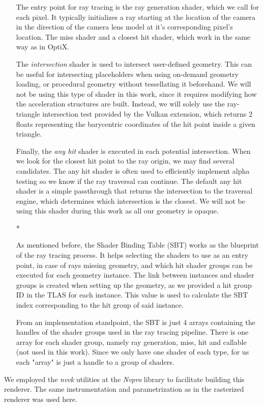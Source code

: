 \begin{itemize}
{    The entry point for ray tracing is the ray generation shader, which we call for each pixel. It typically initializes a ray starting at the location of the camera in the direction of the camera lens model at it's corresponding pixel's location. The miss shader and a closest hit shader, which work in the same way as in OptiX.

    The \textit{intersection} shader is used to intersect user-defined geometry. This can be useful for intersecting placeholders when using on-demand geometry loading, or procedural geometry without tessellating it beforehand. We will not be using this type of shader in this work, since it requires modifying how the acceleration structures are built. Instead, we will solely use the ray-triangle intersection test provided by the Vulkan extension, which returns 2 floats representing the barycentric coordinates of the hit point inside a given triangle.

    Finally, the \textit{any hit} shader is executed in each potential intersection. When we look for the closest hit point to the ray origin, we may find several candidates. The any hit shader is often used to efficiently implement alpha testing so we know if the ray traversal can continue. The default any hit shader is a simple passthrough that returns the intersection to the traversal engine, which determines which intersection is the closest. We will not be using this shader during this work as all our geometry is opaque.}
  \item[*]{As mentioned before, the Shader Binding Table (SBT) works as the blueprint of the ray tracing process. It helps selecting the shaders to use as an entry point, in case of rays missing geometry, and which hit shader groups can be executed for each geometry instance. The link between instances and shader groups is created when setting up the geometry, as we provided a hit group ID in the TLAS for each instance. This value is used to calculate the SBT index corresponding to the hit group of said instance.

    From an implementation standpoint, the SBT is just 4 arrays containing the handles of the shader groups used in the ray tracing pipeline. There is one array for each shader group, namely ray generation, miss, hit and callable (not used in this work). Since we only have one shader of each type, for us each "array" is just a handle to a group of shaders.}
\end{itemize}

We employed the \textit{nvvk} utilities at the \textit{Nvpro} library \cite{Nvpro} to facilitate building this renderer. The same instrumentation and parametrization as in the rasterized renderer was used here.


